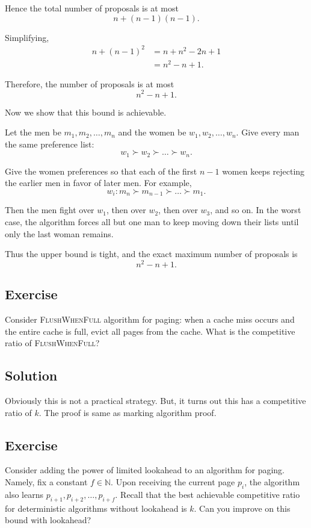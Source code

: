 \documentclass[14pt]{extreport}
\newcounter{counter}
\newcommand{\Exercise}{Exercise \stepcounter{counter}\thecounter}
\begin{document}
    \vspace{2mm}
    Hence the total number of proposals is at most
    $$n + (n - 1)(n - 1).$$

    Simplifying,
    $$\begin{aligned}
        n + (n - 1)^2
        &= n + n^2 - 2n + 1 \\
        &= n^2 - n + 1.
    \end{aligned}$$

    Therefore, the number of proposals is at most
    $$n^{2} - n + 1.$$
    
    Now we show that this bound is achievable.

    \vspace{2mm}
    Let the men be $m_1, m_2, \dots, m_n$
    and the women be $w_1, w_2, \dots, w_n.$ Give every man the same preference list:
    $$w_1 \succ w_2 \succ \dots \succ w_n.$$

    Give the women preferences so that each of the first $n - 1$ women keeps rejecting the earlier men in favor of later men. For example,
    $$w_i: m_n \succ m_{n - 1} \succ \dots \succ m_1.$$

    Then the men fight over $w_1$, then over $w_2$, then over $w_3$, and so on. In the worst case, the algorithm forces all but one man to keep moving down their lists until only the last woman remains.

    \vspace{2mm}
    Thus the upper bound is tight, and the exact maximum number of proposals is
    $$n^{2} - n + 1.$$

\subsection*{\Exercise}
    Consider \textsc{FlushWhenFull} algorithm for paging: when a cache miss occurs and the entire cache is full, evict all pages from the cache. What is the competitive ratio of \textsc{FlushWhenFull}?

\subsection*{Solution}
    Obviously this is not a practical strategy. But, it turns out this has a competitive ratio of $k$. The proof is same as marking algorithm proof.
    
\subsection*{\Exercise}    
    Consider adding the power of limited lookahead to an algorithm for paging. Namely, fix a constant $f \in \mathbb{N}$. Upon receiving the current page $p_i$, the algorithm also learns $p_{i+1}, p_{i+2}, \dots, p_{i+f}$. Recall that the best achievable competitive ratio for deterministic algorithms without lookahead is $k$. Can you improve on this bound with lookahead?
    
\end{document}
